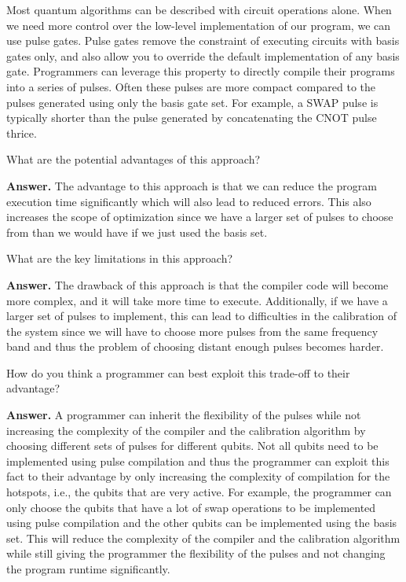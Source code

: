 Most quantum algorithms can be described with circuit operations alone. When we need more control over the low-level implementation of our program, we can use pulse gates. Pulse gates remove the constraint of executing circuits with basis gates only, and also allow you to override the default implementation of any basis gate. Programmers can leverage this property to directly compile their programs into a series of pulses. Often these pulses are more compact compared to the pulses generated using only the basis gate set. For example, a SWAP pulse is typically shorter than the pulse generated by concatenating the CNOT pulse thrice.

\tcbline{}

\begin{question}
    What are the potential advantages of this approach?
\end{question}
\textbf{Answer.} The advantage to this approach is that we can reduce the program execution time significantly which will also lead to reduced errors. This also increases the scope of optimization since we have a larger set of pulses to choose from than we would have if we just used the basis set.

\tcbline{}

\begin{question}
    What are the key limitations in this approach?
\end{question}
\textbf{Answer.} The drawback of this approach is that the compiler code will become more complex, and it will take more time to execute. Additionally, if we have a larger set of pulses to implement, this can lead to difficulties in the calibration of the system since we will have to choose more pulses from the same frequency band and thus the problem of choosing distant enough pulses becomes harder.

\tcbline{}

\begin{question}
    How do you think a programmer can best exploit this trade-off to their advantage?
\end{question}
\textbf{Answer.} A programmer can inherit the flexibility of the pulses while not increasing the complexity of the compiler and the calibration algorithm by choosing different sets of pulses for different qubits. Not all qubits need to be implemented using pulse compilation and thus the programmer can exploit this fact to their advantage by only increasing the complexity of compilation for the hotspots, i.e., the qubits that are very active. For example, the programmer can only choose the qubits that have a lot of swap operations to be implemented using pulse compilation and the other qubits can be implemented using the basis set. This will reduce the complexity of the compiler and the calibration algorithm while still giving the programmer the flexibility of the pulses and not changing the program runtime significantly.

